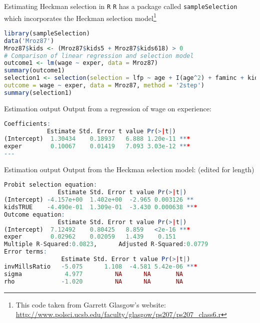\documentclass[english,aspectratio=169,12pt,xcolor=dvipsnames]{beamer}
\begin{document}
\begin{frame}[fragile]{Estimating Heckman selection in \texttt{R}}
    \texttt{R} has a package called \texttt{sampleSelection} which incorporates the Heckman selection model\footnote{This code taken from Garrett Glasgow's website: \url{http://www.polsci.ucsb.edu/faculty/glasgow/ps207/ps207_class6.r}}

\begin{lstlisting}[language=R]
library(sampleSelection)
data('Mroz87')
Mroz87$kids <- (Mroz87$kids5 + Mroz87$kids618) > 0
# Comparison of linear regression and selection model
outcome1 <- lm(wage ~ exper, data = Mroz87)
summary(outcome1)
selection1 <- selection(selection = lfp ~ age + I(age^2) + faminc + kids + educ,
outcome = wage ~ exper, data = Mroz87, method = '2step')
summary(selection1)
\end{lstlisting}

\end{frame}



\begin{frame}[fragile]{Estimation output}
    Output from a regression of wage on experience:

\begin{lstlisting}[language=R]
Coefficients:
            Estimate Std. Error t value Pr(>|t|)
(Intercept)  1.30434    0.18937   6.888 1.20e-11 ***
exper        0.10067    0.01419   7.093 3.03e-12 ***
---
\end{lstlisting}

\end{frame}


\begin{frame}[fragile]{Estimation output}
    Output from the Heckman selection model: (edited for length)

\begin{lstlisting}[language=R]
Probit selection equation:
               Estimate Std. Error t value Pr(>|t|)
(Intercept) -4.157e+00  1.402e+00  -2.965 0.003126 **
kidsTRUE    -4.490e-01  1.309e-01  -3.430 0.000638 ***
Outcome equation:
               Estimate Std. Error t value Pr(>|t|)
(Intercept)  7.12492    0.80425   8.859   <2e-16 ***
exper        0.02962    0.02059   1.439    0.151
Multiple R-Squared:0.0823,      Adjusted R-Squared:0.0779
Error terms:
                Estimate Std. Error t value Pr(>|t|)
invMillsRatio   -5.075      1.108  -4.581 5.42e-06 ***
sigma            4.977         NA      NA       NA
rho             -1.020         NA      NA       NA
\end{lstlisting}

\end{frame}
\end{document}
